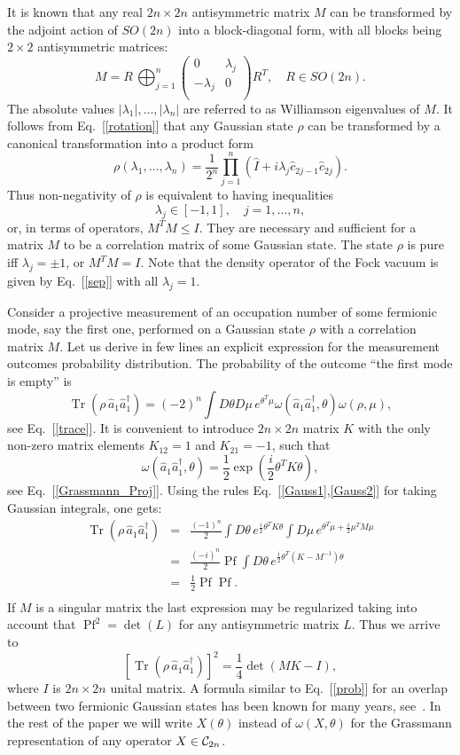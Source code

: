 \documentclass[twocolumn,showpacs,preprintnumbers,superscriptaddress]{revtex4}
\newcommand{\Clif}{{\cal C}}
\newcommand{\be}{\begin{equation}}
\newcommand{\ee}{\end{equation}}
\newcommand{\nn}{\nonumber}
\newcommand{\ba}{\begin{array}}
\newcommand{\ea}{\end{array}}
\newcommand{\Pf}[1]{\mathop{\mathrm{Pf}(#1)}}
\newcommand{\aop}{{\hat{a}}}
\newcommand{\cop}{{\hat{c}}}
\newcommand{\Iop}{{\hat{I}}}
\DeclareMathOperator*{\tr}{\mathop{\mathrm{Tr}}}
\begin{document}
It is known that any real $2n\times 2n$ antisymmetric matrix $M$ can be
transformed by the adjoint action of $SO(2n)$ into a block-diagonal 
form, with all blocks being $2\times 2$ antisymmetric matrices:
\be\label{M_0}
M = R\, \bigoplus_{j=1}^n
\left( \ba{cc} 0 & \lambda_j \\ -\lambda_j & 0\\ \ea \right) R^T,
\quad R\in SO(2n).
\ee
The absolute values $|\lambda_1|,\ldots,|\lambda_n|$ are referred to as
Williamson eigenvalues of $M$.
It follows from Eq.~[\ref{rotation}] that any Gaussian state $\rho$
can be transformed by a canonical transformation into a product form
\be\label{sep}
\rho(\lambda_1,\ldots,\lambda_n)=
\frac1{2^n} \prod_{j=1}^n (\Iop + i\lambda_j \cop_{2j-1}\cop_{2j}).
\ee
Thus non-negativity of $\rho$ is equivalent to having inequalities 
\[
\lambda_j\in [-1,1], \quad j=1,\ldots, n,
\]
or, in terms of operators, $M^T M \le I$. They are 
necessary and sufficient for a matrix $M$ to be a correlation matrix
of some Gaussian state. The state $\rho$ is pure iff $\lambda_j=\pm 1$,
or $M^T M = I$. Note that the density operator of the Fock vacuum 
is given by Eq.~[\ref{sep}] with all $\lambda_j=1$.

Consider a projective measurement of an occupation number of some 
fermionic mode, say the first one, performed on a Gaussian state
$\rho$ with a correlation matrix $M$.   
Let us   derive in
few lines an explicit expression for the measurement outcomes
probability distribution. The probability of the 
outcome ``the first mode is empty'' is
\[
\tr{(\rho\, \aop_1 \aop_1^\dag)} =
{(-2)}^n 
\int D\theta D\mu\,  e^{\theta^T \mu} \omega(\aop_1\aop_1^\dag,\theta)\omega(\rho,\mu),
\]
see Eq.~[\ref{trace}]. It is convenient to introduce $2n\times 2n$ matrix
$K$ with the only non-zero matrix elements $K_{12}=1$ and $K_{21}=-1$, such that
\[
\omega(\aop_1\aop_1^\dag,\theta)=\frac12 
\exp{\left( \frac{i}2 \theta^T K \theta \right)},
\]
see Eq.~[\ref{Grassmann_Proj}]. Using the 
rules Eq.~[\ref{Gauss1},\ref{Gauss2}] for taking Gaussian integrals,
one gets:
\begin{eqnarray}\nn
\tr{(\rho\, \aop_1 \aop_1^\dag)} &=& 
\frac{{(-1)}^n}{2} \int D\theta\,  e^{\frac{i}2 \theta^T K \theta}
\int D\mu\,  e^{ \theta^T \mu + \frac{i}2 \mu^T M \mu } \nn \\
 &=& 
\frac{(-i)^n}{2} \Pf{M}
\int D\theta\, 
e^{ \frac{i}2 \theta^T (K - M^{-1})\theta  } \nn \\
 &=&
\frac1{2} \Pf{M} \Pf{K - M^{-1}}.\nn \\
\end{eqnarray}
If $M$ is a singular matrix the last expression may be regularized
taking into account that $\Pf{L}^2=\det{(L)}$ for any antisymmetric matrix $L$.
Thus we arrive to
\be\label{prob}
\left[ \tr(\rho\, \aop_1\aop_1^\dag)\right]^2 =
\frac14 \det{\left( M K - I \right)},
\ee
where $I$ is $2n\times 2n$ unital matrix.
A formula similar to Eq.~[\ref{prob}] 
for an overlap between two fermionic Gaussian states
has been known for many years,  see~\cite{Lowdin55}.
In the rest of the paper we will write $X(\theta)$ instead of $\omega(X,\theta)$
for the Grassmann representation of any  operator $X\in \Clif_{2n}$.
\end{document}
